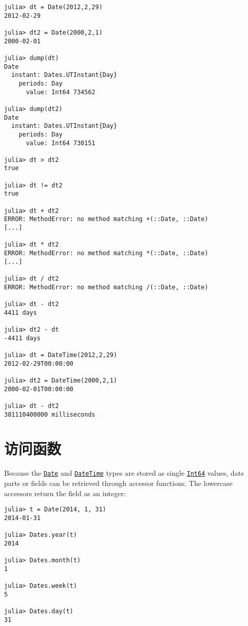 \begin{verbatim}
julia> dt = Date(2012,2,29)
2012-02-29

julia> dt2 = Date(2000,2,1)
2000-02-01

julia> dump(dt)
Date
  instant: Dates.UTInstant{Day}
    periods: Day
      value: Int64 734562

julia> dump(dt2)
Date
  instant: Dates.UTInstant{Day}
    periods: Day
      value: Int64 730151

julia> dt > dt2
true

julia> dt != dt2
true

julia> dt + dt2
ERROR: MethodError: no method matching +(::Date, ::Date)
[...]

julia> dt * dt2
ERROR: MethodError: no method matching *(::Date, ::Date)
[...]

julia> dt / dt2
ERROR: MethodError: no method matching /(::Date, ::Date)

julia> dt - dt2
4411 days

julia> dt2 - dt
-4411 days

julia> dt = DateTime(2012,2,29)
2012-02-29T00:00:00

julia> dt2 = DateTime(2000,2,1)
2000-02-01T00:00:00

julia> dt - dt2
381110400000 milliseconds
\end{verbatim}



\hypertarget{1797872614315202652}{}


\section{访问函数}



Because the \hyperlink{4488183467971164548}{\texttt{Date}} and \hyperlink{17572689933274889838}{\texttt{DateTime}} types are stored as single \hyperlink{7720564657383125058}{\texttt{Int64}} values, date parts or fields can be retrieved through accessor functions. The lowercase accessors return the field as an integer:




\begin{verbatim}
julia> t = Date(2014, 1, 31)
2014-01-31

julia> Dates.year(t)
2014

julia> Dates.month(t)
1

julia> Dates.week(t)
5

julia> Dates.day(t)
31
\end{verbatim}



